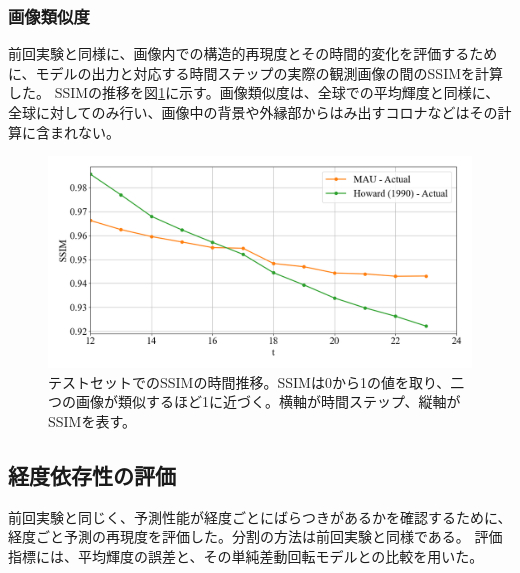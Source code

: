       \subsubsection{画像類似度}
        前回実験と同様に、画像内での構造的再現度とその時間的変化を評価するために、モデルの出力と対応する時間ステップの実際の観測画像の間のSSIMを計算した。
        SSIMの推移を図\ref{fig:exp2_ssim}に示す。画像類似度は、全球での平均輝度と同様に、全球に対してのみ行い、画像中の背景や外縁部からはみ出すコロナなどはその計算に含まれない。
        \begin{figure}[htbp]
          \centering
          \includegraphics[width=\textwidth]{figures/exp2/average_ssim.png}
          \caption{テストセットでのSSIMの時間推移。SSIMは0から1の値を取り、二つの画像が類似するほど1に近づく。横軸が時間ステップ、縦軸がSSIMを表す。}
          \label{fig:exp2_ssim}
        \end{figure}

        
      \subsection{経度依存性の評価}
        前回実験と同じく、予測性能が経度ごとにばらつきがあるかを確認するために、経度ごと予測の再現度を評価した。分割の方法は前回実験と同様である。
        評価指標には、平均輝度の誤差と、その単純差動回転モデルとの比較を用いた。


